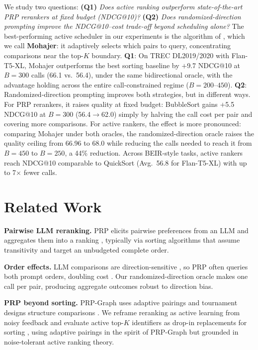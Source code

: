\documentclass[11pt]{article}
\begin{document}
We study two questions:
\textbf{(Q1)} \emph{Does active ranking outperform state-of-the-art PRP rerankers at fixed budget (NDCG@10)?}
\textbf{(Q2)} \emph{Does randomized-direction prompting improve the NDCG@10--cost trade-off beyond scheduling alone?}
The best-performing active scheduler in our experiments is the algorithm of \citet{mohajer2017active}, which we call \textbf{Mohajer}: it adaptively selects which pairs to query, concentrating comparisons near the top-$K$ boundary.
\textbf{Q1}: On TREC DL2019/2020 with Flan-T5-XL, Mohajer outperforms the best sorting baseline by $+$9.7 NDCG@10 at $B{=}300$ calls (66.1 vs.\ 56.4), under the same bidirectional oracle, with the advantage holding across the entire call-constrained regime ($B{=}200$--$450$).
\textbf{Q2}: Randomized-direction prompting improves both strategies, but in different ways.
For PRP rerankers, it raises quality at fixed budget: BubbleSort gains $+$5.5 NDCG@10 at $B{=}300$ (56.4$\to$62.0) simply by halving the call cost per pair and covering more comparisons.
For active rankers, the effect is more pronounced: comparing Mohajer under both oracles, the randomized-direction oracle raises the quality ceiling from 66.96 to 68.0 while reducing the calls needed to reach it from $B{=}450$ to $B{=}250$, a 44\% reduction.
Across BEIR-style tasks, active rankers reach NDCG@10 comparable to QuickSort (Avg.\ 56.8 for Flan-T5-XL) with up to 7$\times$ fewer calls.

\section{Related Work}

\noindent\textbf{Pairwise LLM reranking.}
PRP elicits pairwise preferences from an LLM and aggregates them into a ranking \citep{sun2023chatgptsearch,qin2024pairwise}, typically via sorting algorithms that assume transitivity and target an unbudgeted complete order.

\noindent\textbf{Order effects.}
LLM comparisons are direction-sensitive \citep{shi2024judges,yin2025fragile,jeong2025comparativetrap}, so PRP often queries both prompt orders, doubling cost \citep{qin2024pairwise,wu2025realtimeprp}.
Our randomized-direction oracle makes one call per pair, producing aggregate outcomes robust to direction bias.

\noindent\textbf{PRP beyond sorting.}
PRP-Graph uses adaptive pairings \citep{luo-etal-2024-prp} and tournament designs structure comparisons \citep{chen2024tourrank}.
We reframe reranking as active learning from noisy feedback and evaluate active top-$K$ identifiers as drop-in replacements for sorting \citep{heckel2016activeranking,shah2018simplerobust,ren2020bestk,mohajer2017active}, using adaptive pairings in the spirit of PRP-Graph but grounded in noise-tolerant active ranking theory.
\end{document}
